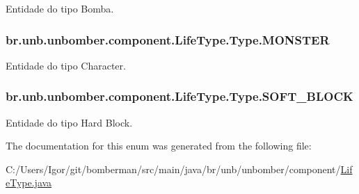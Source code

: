 Entidade do tipo Bomba. 

\hypertarget{enumbr_1_1unb_1_1unbomber_1_1component_1_1_life_type_1_1_type_a62292fe6af355b045cb8ec241e0d5ad1}{
\subsubsection[{M\+O\+N\+S\+T\+E\+R}]{\setlength{\rightskip}{0pt plus 5cm}br.\+unb.\+unbomber.\+component.\+Life\+Type.\+Type.\+M\+O\+N\+S\+T\+E\+R}}\label{enumbr_1_1unb_1_1unbomber_1_1component_1_1_life_type_1_1_type_a62292fe6af355b045cb8ec241e0d5ad1}


Entidade do tipo Character. 

\hypertarget{enumbr_1_1unb_1_1unbomber_1_1component_1_1_life_type_1_1_type_a1770b750cafe46b02ef1071ffdaef821}{
\subsubsection[{S\+O\+F\+T\+\_\+\+B\+L\+O\+C\+K}]{\setlength{\rightskip}{0pt plus 5cm}br.\+unb.\+unbomber.\+component.\+Life\+Type.\+Type.\+S\+O\+F\+T\+\_\+\+B\+L\+O\+C\+K}}\label{enumbr_1_1unb_1_1unbomber_1_1component_1_1_life_type_1_1_type_a1770b750cafe46b02ef1071ffdaef821}


Entidade do tipo Hard Block. 



The documentation for this enum was generated from the following file\+:\begin{DoxyCompactItemize}
\item 
C\+:/\+Users/\+Igor/git/bomberman/src/main/java/br/unb/unbomber/component/\hyperlink{_life_type_8java}{Life\+Type.\+java}\end{DoxyCompactItemize}
